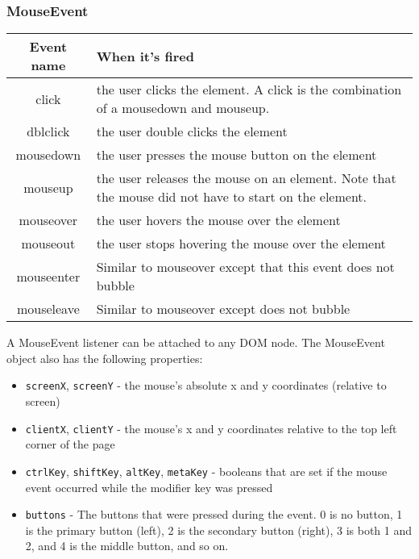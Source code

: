 \documentclass[12pt]{article}
\begin{document}
\subsubsection*{MouseEvent}
\begin{center}
  \begin{tabular}{| c | p{10.4cm} |}
    \hline
    \textbf{Event name} & \textbf{When it's fired} \\
    \hline
    click & the user clicks the element. A click is the combination of a mousedown and mouseup. \\
    \hline
    dblclick & the user double clicks the element \\
    \hline
    mousedown & the user presses the mouse button on the
                element \\
    \hline
    mouseup & the user releases the mouse on an element.
              Note that the mouse did not have to start on the element. \\
    \hline
    mouseover & the user hovers the mouse over the
                element \\
     \hline
    mouseout & the user stops hovering the mouse over
               the element \\
    \hline
    mouseenter & Similar to mouseover except that this event
                 does not bubble \\
    \hline
    mouseleave & Similar to mouseover except does not
                 bubble \\
    \hline
  \end{tabular}
\end{center}
A MouseEvent listener can be attached to any DOM node. The MouseEvent object also has the following properties:
\begin{itemize}
\item \texttt{screenX}, \texttt{screenY} - the mouse's absolute x and y coordinates (relative to screen)
\item \texttt{clientX}, \texttt{clientY} - the mouse's x and y coordinates relative to the top left corner of the page
\item \texttt{ctrlKey}, 
\texttt{shiftKey}, \texttt{altKey}, \texttt{metaKey} - booleans that are set if the mouse event occurred while the  modifier key was pressed
\item \texttt{buttons} - The buttons that were pressed during the event. 0 is no button, 1 is the primary button (left), 2 is the secondary button (right), 3 is both 1 and 2, and 4 is the middle button, and so on.
\end{itemize}
\end{document}
